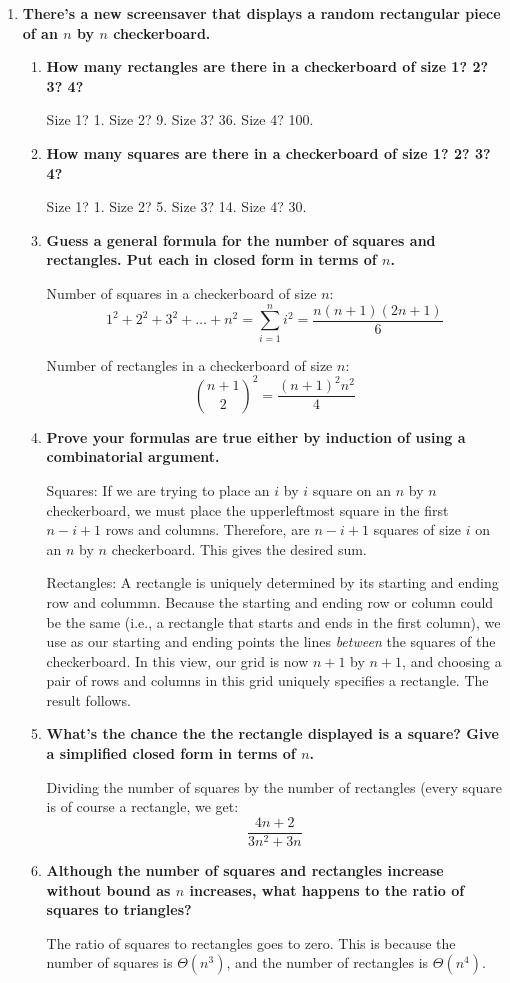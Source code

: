 \documentclass[12pt]{amsart}
\begin{document}
\begin{enumerate}
\medskip

\item {\bf There's a new screensaver that displays a random rectangular piece of an $n$ by $n$ checkerboard.}
\begin{enumerate}
\item {\bf How many rectangles are there in a checkerboard of size 1? 2? 3? 4?}

Size 1?  1.  Size 2?  9.  Size 3?  36.  Size 4? 100.

\item {\bf How many squares are there in a checkerboard of size 1? 2? 3? 4?}

Size 1?  1.  Size 2?  5.  Size 3? 14.  Size 4?  30.

\item {\bf Guess a general formula for the number of squares and rectangles.  Put each in closed form in terms of $n$.}

Number of squares in a checkerboard of size $n$:
$$1^2 + 2^2 + 3^2 + \ldots + n^2 = \sum_{i=1}^n i^2 = \frac{n(n+1)(2n+1)}{6}$$

Number of rectangles in a checkerboard of size $n$:
$$
{n+1 \choose 2}^2 = \frac{(n+1)^2 n^2}{4}
$$

\item {\bf Prove your formulas are true either by induction of using a combinatorial argument.}

Squares: If we are trying to place an $i$ by $i$ square on an $n$ by
$n$ checkerboard, we must place the upperleftmost square in the first
$n-i+1$ rows and columns.  Therefore, are $n-i+1$ squares of size $i$
on an $n$ by $n$ checkerboard.  This gives the desired sum.

Rectangles: A rectangle is uniquely determined by its starting and
ending row and colummn.  Because the starting and ending row or column
could be the same (i.e., a rectangle that starts and ends in the first
column), we use as our starting and ending points the lines {\em
between} the squares of the checkerboard.  In this view, our grid is
now $n+1$ by $n+1$, and choosing a pair of rows and columns in this
grid uniquely specifies a rectangle.  The result follows.

\item {\bf What's the chance the the rectangle displayed is a square?  Give a simplified closed form in terms of $n$.}

Dividing the number of squares by the number of rectangles (every
square is of course a rectangle, we get:
$$
\frac{4n+2}{3n^2+3n}
$$
\item {\bf Although the number of squares and rectangles increase without bound as $n$ increases, what happens to the ratio of squares to triangles?}

The ratio of squares to rectangles goes to zero.  This is because the
number of squares is $\Theta(n^3)$, and the number of rectangles is
$\Theta(n^4)$.

\end{enumerate}

\end{enumerate}
\end{document}
